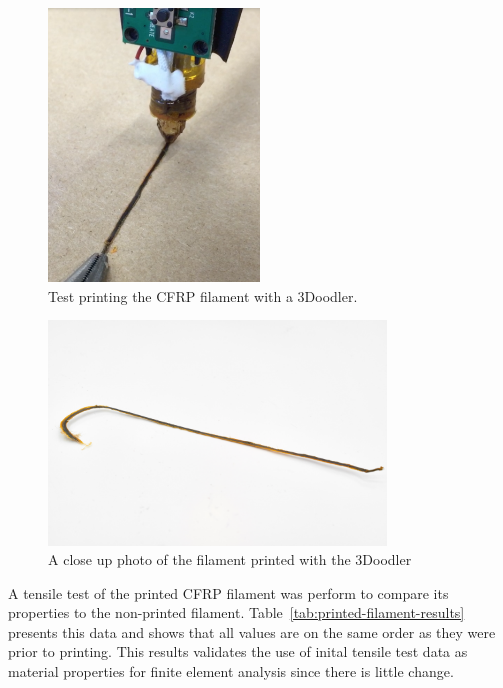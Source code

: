 \begin{figure}[htp]
    \centering
    \includegraphics[width=0.5\textwidth]{./figures/filament-print-3doodler-during}
    \caption{Test printing the CFRP filament with a 3Doodler.}
    \label{fig:filament-print-3doodler-during}
\end{figure}

\begin{figure}[htp]
    \centering
    \includegraphics[width=0.8\textwidth]{./figures/filament-extrude}
    \caption{A close up photo of the filament printed with the 3Doodler}
    \label{fig:filament-extrude}
\end{figure}

A tensile test of the printed CFRP filament was perform to compare its properties to the non-printed filament. Table~\ref{tab:printed-filament-results} presents this data and shows that all values are on the same order as they were prior to printing. This results validates the use of inital tensile test data as material properties for finite element analysis since there is little change.\\

